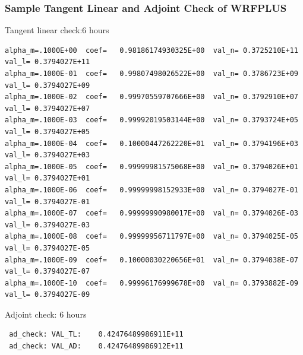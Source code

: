 \documentclass{beamer}
\begin{document}
\begin{frame}[fragile]
\frametitle{Sample Tangent Linear and Adjoint Check of WRFPLUS }
\begin{beamerboxesrounded}[ lower=postit,shadow=true]{Tangent linear check:6 hours}
{\tiny
\begin{verbatim}
alpha_m=.1000E+00  coef=   0.98186174930325E+00  val_n= 0.3725210E+11  val_l= 0.3794027E+11
alpha_m=.1000E-01  coef=   0.99807498026522E+00  val_n= 0.3786723E+09  val_l= 0.3794027E+09
alpha_m=.1000E-02  coef=   0.99970559707666E+00  val_n= 0.3792910E+07  val_l= 0.3794027E+07
alpha_m=.1000E-03  coef=   0.99992019503144E+00  val_n= 0.3793724E+05  val_l= 0.3794027E+05
alpha_m=.1000E-04  coef=   0.10000447262220E+01  val_n= 0.3794196E+03  val_l= 0.3794027E+03
alpha_m=.1000E-05  coef=   0.99999981575068E+00  val_n= 0.3794026E+01  val_l= 0.3794027E+01
alpha_m=.1000E-06  coef=   0.99999998152933E+00  val_n= 0.3794027E-01  val_l= 0.3794027E-01
alpha_m=.1000E-07  coef=   0.99999990980017E+00  val_n= 0.3794026E-03  val_l= 0.3794027E-03
alpha_m=.1000E-08  coef=   0.99999956711797E+00  val_n= 0.3794025E-05  val_l= 0.3794027E-05
alpha_m=.1000E-09  coef=   0.10000030220656E+01  val_n= 0.3794038E-07  val_l= 0.3794027E-07
alpha_m=.1000E-10  coef=   0.99996176999678E+00  val_n= 0.3793882E-09  val_l= 0.3794027E-09
\end{verbatim}
}
\end{beamerboxesrounded}
\begin{beamerboxesrounded}[ lower=postit,shadow=true]{Adjoint check: 6 hours}
{\tiny
\begin{verbatim}
 ad_check: VAL_TL:    0.42476489986911E+11
 ad_check: VAL_AD:    0.42476489986912E+11
\end{verbatim}
}
\end{beamerboxesrounded}
\end{frame}
\end{document}
